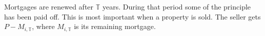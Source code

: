 {Mortgages are renewed after $\mathbb{T}$ years. During that period some of the principle has been paid off. This is most important when a property is sold. The seller gets $P-M_{i,\mathbb{T}}$, where  $M_{i,\mathbb{T}}$ is its remaining mortgage.



















}
